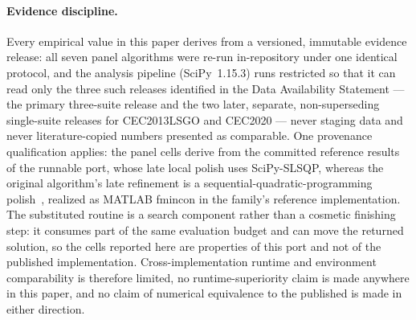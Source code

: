 \paragraph{Evidence discipline.}
Every empirical value in this paper derives from a versioned, immutable
evidence release: all seven
panel algorithms were re-run in-repository under one identical
protocol, and the analysis pipeline
(SciPy~1.15.3) runs
restricted so that it can read only the three such releases identified in
the Data Availability Statement --- the primary three-suite release and
the two later, separate, non-superseding single-suite releases for
CEC2013LSGO and CEC2020 --- never staging data and never
literature-copied numbers
presented as comparable.
One provenance qualification applies: the \egsk{} panel cells derive
from the committed reference results of the runnable \egsk{} port,
whose late local polish uses SciPy-SLSQP, whereas the original
algorithm's late refinement is a sequential-quadratic-programming
polish~\cite{jawad2024egsk}, realized as MATLAB fmincon in the family's
reference implementation. The substituted routine is a search
component rather than a cosmetic finishing step: it consumes part of the
same evaluation budget and can move the returned solution, so the \egsk{}
cells reported here are properties of this port and not of the published
implementation. Cross-implementation runtime and environment comparability
is therefore limited, no runtime-superiority claim is made anywhere in this
paper, and no claim of numerical equivalence to the published \egsk{} is
made in either direction.

